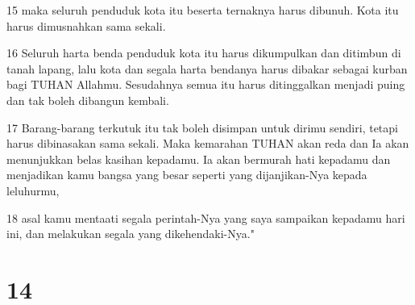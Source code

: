 \par 15 maka seluruh penduduk kota itu beserta ternaknya harus dibunuh. Kota itu harus dimusnahkan sama sekali.
\par 16 Seluruh harta benda penduduk kota itu harus dikumpulkan dan ditimbun di tanah lapang, lalu kota dan segala harta bendanya harus dibakar sebagai kurban bagi TUHAN Allahmu. Sesudahnya semua itu harus ditinggalkan menjadi puing dan tak boleh dibangun kembali.
\par 17 Barang-barang terkutuk itu tak boleh disimpan untuk dirimu sendiri, tetapi harus dibinasakan sama sekali. Maka kemarahan TUHAN akan reda dan Ia akan menunjukkan belas kasihan kepadamu. Ia akan bermurah hati kepadamu dan menjadikan kamu bangsa yang besar seperti yang dijanjikan-Nya kepada leluhurmu,
\par 18 asal kamu mentaati segala perintah-Nya yang saya sampaikan kepadamu hari ini, dan melakukan segala yang dikehendaki-Nya."

\chapter{14}

